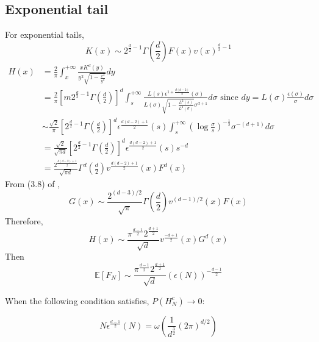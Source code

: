\documentclass{article}
\def\E{\mathbb{E}}
\begin{document}
\subsection{Exponential tail}
For exponential tails,
\begin{equation}
    K(x) \sim 2^{\frac{d}{2}-1} \Gamma\left(\frac{d}{2}\right)F(x) v(x)^{\frac{d}{2}-1}    
\end{equation}
\begin{align*}
    H(x) & = \frac{2}{\pi} \int_x^{+\infty}\frac{x K^d(y)}{y^2 \sqrt{1-\frac{x^2}{y^2}}}dy\\
    &=\frac{2}{\pi}\left[m 2^{\frac{d}{2}-1} \Gamma\left(\frac{d}{2}\right)\right]^d
    \int_s^{+\infty}\frac{L(s) \epsilon^{1+\frac{d(d-2)}{2}}(\sigma)}{L(\sigma) \sqrt{1-\frac{L^2(s)}{L^2(\sigma)}}\sigma^{d+1}} d\sigma
    \textrm{ since } dy=L(\sigma)\frac{\epsilon(\sigma)}{\sigma}d\sigma \\
    &\sim  \frac{\sqrt{2}}{\pi}
    \left[2^{\frac{d}{2}-1} \Gamma\left(\frac{d}{2}\right)\right]^d
    \epsilon^{\frac{d(d-2)+1}{2}}(s)
    \int_s^{+\infty} \left(\log\frac{\sigma}{s}
    \right)^{-\frac{1}{2}}
    \sigma^{-(d+1)}d\sigma \\
    &= \frac{\sqrt{2}}{\sqrt{\pi d}}\left[2^{\frac{d}{2}-1} \Gamma\left(\frac{d}{2}\right)\right]^d
    \epsilon^{\frac{d(d-2)+1}{2}}(s)s^{-d}\\
    &= \frac{2^{\frac{d(d-2)+1}{2}}}{\sqrt{\pi d}}\Gamma^d\left(\frac{d}{2}\right)
    v^{\frac{d(d-2)+1}{2}}(x)F^d(x)
\end{align*}
From (3.8) of \cite{dwyer1991convex},
\begin{equation}
    G(x) \sim \frac{2^{(d-3)/2}}{\sqrt{\pi}}\Gamma(\frac{d}{2}) v^{(d-1)/2}(x) F(x)
\end{equation}
Therefore,
\begin{equation}
    H(x) \sim \frac{\pi^{\frac{d-1}{2}} 2^{\frac{d+1}{2}}}{\sqrt{d}}v^{\frac{-d+1}{2}}(x)G^d(x)
\end{equation}
Then
\begin{equation}
    \E[F_N]\sim \frac{\pi^{\frac{d-1}{2}} 2^{\frac{d+1}{2}}}{\sqrt{d}} (\epsilon(N))^{-\frac{d-1}{2}}
\end{equation}

When the following condition satisfies, $P(H_N^c) \to 0$:

\begin{equation}
    N \epsilon^{\frac{d-1}{2}}(N) = \omega(\frac{1}{d^\frac{3}{2}} (2\pi)^{d/2})
\end{equation}
\end{document}
